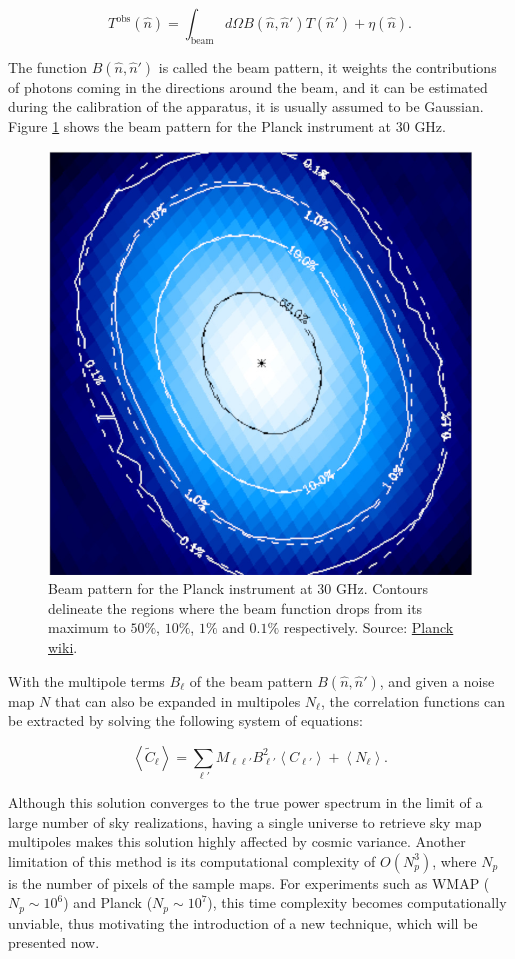 \documentclass[openany,a4paper,12pt,oneside]{book}
\newcommand{\av}[1]{\left\langle #1 \right\rangle} %
\begin{document}
\begin{spacing}{1.5}
\begin{equation}\label{def:beam_pattern}
	T^\text{obs}(\hat{n})=\int_\text{beam} d\Omega B(\hat{n},\hat{n}')T(\hat{n}')+\eta(\hat{n}).
\end{equation}

The function $B(\hat{n}, \hat{n}')$ is called the beam pattern, it weights the contributions of photons coming in the directions around the beam, and it can be estimated during the calibration of the apparatus, it is usually assumed to be Gaussian. Figure \ref{fig:beam_pattern} shows the beam pattern for the Planck instrument at $30\text{ GHz}$.

\begin{figure}[!htb]
	\centering
	\includegraphics[width=.55\linewidth]{Imagens/beam_pattern.png}
	\caption{Beam pattern for the Planck instrument at $30\text{ GHz}$. Contours delineate the regions where the beam function drops from its maximum to $50\%$, $10\%$, $1\%$ and $0.1\%$ respectively. Source: \href{https://wiki.cosmos.esa.int/planckpla/index.php/Effective_Beams}{Planck wiki}.}
	\label{fig:beam_pattern}
\end{figure}

With the multipole terms $B_\ell$ of the beam pattern $B(\hat{n}, \hat{n}')$, and given a noise map $N$ that can also be expanded in multipoles $N_\ell$, the correlation functions can be extracted by solving the following system of equations:

\begin{equation}\label{ch3:av(tilde_Cl)}
    \av{\tilde{C}_\ell}=\sum_{\ell'} M_{\ell \ell'}B_{\ell'}^2\av{C_{\ell'}}+\av{N_\ell}.
\end{equation}

Although this solution converges to the true power spectrum in the limit of a large number of sky realizations, having a single universe to retrieve sky map multipoles makes this solution highly affected by cosmic variance\cite{Moura-Santos_2016}. Another limitation of this method is its computational complexity of $O(N_p^3)$, where $N_p$ is the number of pixels of the sample maps. For experiments such as WMAP ($N_p\sim 10^6$) and Planck ($N_p \sim 10^7$), this time complexity becomes computationally unviable, thus motivating the introduction of a new technique, which will be presented now.


\end{spacing}
\end{document}
